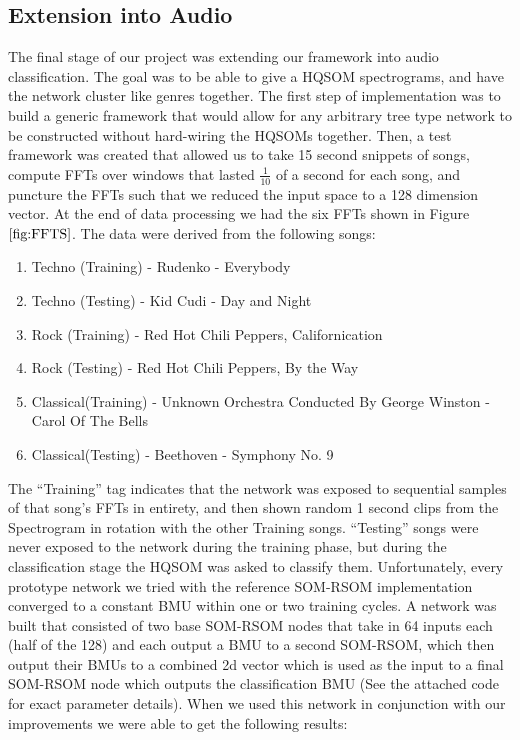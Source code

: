 \documentclass[a4paper,10pt]{article}
\begin{document}
\subsection{Extension into Audio}
The final stage of our project was extending our framework into audio classification.  The goal was
to be able to give a HQSOM spectrograms, and have the network cluster like genres together. 
The first step of implementation was to build a generic framework that would allow for any arbitrary
tree type network to be constructed without hard-wiring the HQSOMs together.  Then, a test
framework was created that allowed us to take 15 second snippets of songs, compute FFTs over windows
that lasted $\frac{1}{10}$ of a second for each song, and puncture the FFTs such that we reduced the
input space to a 128 dimension vector.  At the end of data processing we had the six FFTs shown in
Figure $\ref{fig:FFTS}$. The data were derived from the following songs:
\begin{enumerate}
 \item Techno (Training) - Rudenko - Everybody
 \item Techno (Testing) - Kid Cudi - Day and Night
 \item Rock (Training) - Red Hot Chili Peppers, Californication
 \item Rock (Testing) - Red Hot Chili Peppers, By the Way
 \item Classical(Training) - Unknown Orchestra Conducted By George Winston - Carol Of The Bells
 \item Classical(Testing) - Beethoven - Symphony No. 9
\end{enumerate}
The ``Training'' tag indicates that the network was exposed to sequential samples of that song's
FFTs in entirety, and then shown random 1 second clips from the Spectrogram in rotation with the
other Training songs. ``Testing'' songs were never exposed to the network during the training
phase, but during the classification stage the HQSOM was asked to classify them. Unfortunately,
every prototype network we tried with the reference SOM-RSOM implementation converged to a constant
BMU within one or two training cycles. A network was built that consisted of two base SOM-RSOM
nodes that take in 64 inputs each (half of the 128) and each output a BMU to a second SOM-RSOM,
which then output their BMUs to a combined 2d vector which is used as the input to a final SOM-RSOM
node which outputs the classification BMU (See the attached code for exact parameter details).  When
we used this network in conjunction with our improvements we were able to get the following results:
\end{document}
